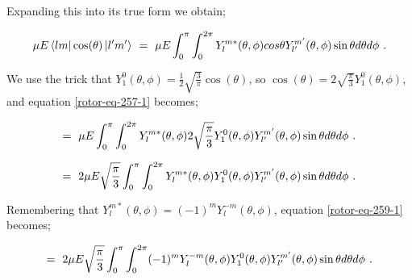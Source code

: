 \documentclass{article}
\begin{document}
Expanding this into its true form we obtain; 

\begin{equation} \label{rotor-eq-257-1}
\mu E\bra{l m}\cos(\theta)\ket{l' m'} \hspace{0.125cm} = \hspace{0.125cm} \mu E \int_{0}^{\pi} \int_{0}^{2\pi} Y_{l}^{m \ast}(\theta, \phi) cos\theta Y_{l'}^{m'}(\theta, \phi) \sin\theta d\theta d\phi \hspace{0.125cm} . 
\end{equation}

We use the trick that \begin{math} Y_{1}^{0}(\theta, \phi)  = \frac{1}{2}\sqrt{\frac{3}{\pi}}\cos(\theta) \end{math}, so \begin{math} \cos(\theta) = {2}\sqrt{\frac{\pi}{3}} Y_{1}^{0}(\theta, \phi)  \end{math}, and equation \ref{rotor-eq-257-1} becomes; 

\begin{equation} \label{rotor-eq-258-1}
= \hspace{0.125cm} \mu E \int_{0}^{\pi} \int_{0}^{2\pi} Y_{l}^{m \ast}(\theta, \phi) {2}\sqrt{\frac{\pi}{3}} Y_{1}^{0}(\theta, \phi) Y_{l'}^{m'}(\theta, \phi) \sin\theta d\theta d\phi \hspace{0.125cm} . 
\end{equation}

\begin{equation} \label{rotor-eq-259-1}
= \hspace{0.125cm} 2 \mu E \sqrt{\frac{\pi}{3}} \int_{0}^{\pi} \int_{0}^{2\pi} Y_{l}^{m \ast}(\theta, \phi) Y_{1}^{0}(\theta, \phi) Y_{l'}^{m'}(\theta, \phi) \sin\theta d\theta d\phi \hspace{0.125cm} . 
\end{equation}

Remembering that \begin{math} Y_{l}^{m \ast}(\theta, \phi)  =  (-1)^{m} Y_{l}^{-m}(\theta, \phi)  \end{math}, equation \ref{rotor-eq-259-1} becomes;

\begin{equation} \label{rotor-eq-260-1}
= \hspace{0.125cm} 2 \mu E \sqrt{\frac{\pi}{3}} \int_{0}^{\pi} \int_{0}^{2\pi} (-1)^{m} Y_{l}^{-m}(\theta, \phi) Y_{1}^{0}(\theta, \phi) Y_{l'}^{m'}(\theta, \phi) \sin\theta d\theta d\phi \hspace{0.125cm} . 
\end{equation}
\end{document}

